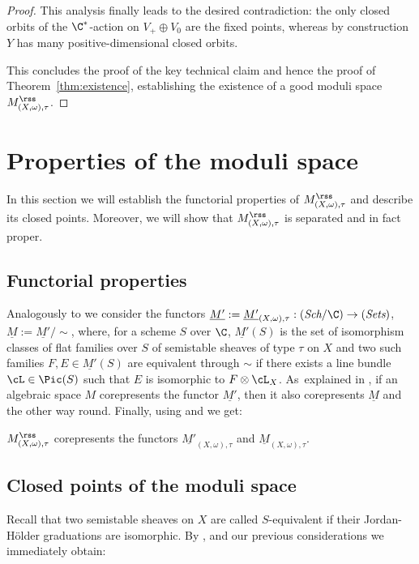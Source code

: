 \begin{proof}
This analysis finally leads to the desired contradiction: the only closed orbits of the $\C^*$-action on $V_+\oplus V_0$ are the fixed points, whereas by construction $Y$ has many positive-dimensional closed orbits.

This concludes the proof of the key technical claim and hence the proof of Theorem~\ref{thm:existence}, establishing the existence of a good moduli space $M_{(X,\omega),\tau}^{{\rss}}$.
\end{proof}

\section{Properties of the moduli space}\label{sect:properties}
In this section we will establish the functorial properties of $M_{(X,\omega),\tau}^{{\rss}}$ and describe its closed points. Moreover, we will show that $M_{(X,\omega),\tau}^{{\rss}}$ is separated and in fact proper.

\subsection{Functorial properties}
Analogously to \cite[\S 4.1]{HL} we consider the functors $\underline{M'}:=\underline{M'}_{(X,\omega),\tau}:(\textit{Sch}/\C)\to (\textit{Sets})$, $\underline{M}:=\underline{M'}/\sim$, where, for a scheme $S$ over $\C$, $\underline{M'}(S)$ is the set of isomorphism classes of flat families over $S$ of semistable sheaves of type $\tau$ on $X$ and two such families $F,E\in\underline{M'}(S)$ are equivalent through $\sim$
if there exists a line bundle $\cL\in\Pic(S)$ such that $E$ is isomorphic to $F\otimes \cL_X$. As~explained in \cite[\S 4.1]{HL}, if an algebraic space $M$ corepresents the functor $\underline{M'}$, then it also corepresents $\underline{M}$ and the other way round. Finally, using \cite[Lem.\,4.3.1]{HL} and \cite[Th.\,4.16(vi)]{Alper13} we get:

\begin{Prop}\label{prop:corepresentaion} $M_{(X,\omega),\tau}^{{\rss}}$ corepresents the functors $\underline{M'}_{(X,\omega),\tau}$ and $\underline{M}_{(X,\omega),\tau}$.
\end{Prop}

\subsection{Closed points of the moduli space}
Recall that two semistable sheaves on $X$ are called $S$-equivalent if their Jordan-Hölder graduations are isomorphic. By \cite[Th.\,4.16(iv)]{Alper13}, \cite[Lem.\,4.1.2]{HL} and our previous considerations we immediately obtain:

